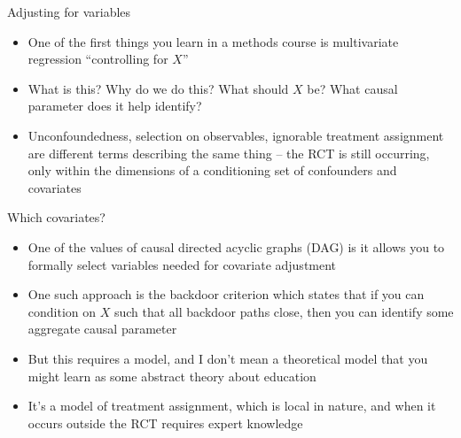 \documentclass{beamer}
\begin{document}
\begin{frame}{Adjusting for variables}

\begin{itemize}
\item One of the first things you learn in a methods course is multivariate regression ``controlling for $X$''
\item What is this? Why do we do this?  What should $X$ be? What causal parameter does it help identify?
\item Unconfoundedness, selection on observables, ignorable treatment assignment are different terms describing the same thing -- the RCT is still occurring, only within the dimensions of a conditioning set of confounders and covariates
\end{itemize}

\end{frame}


\begin{frame}{Which covariates?}

\begin{itemize}

\item One of the values of causal directed acyclic graphs (DAG) is it allows you to formally select variables needed for covariate adjustment
\item One such approach is the backdoor criterion which states that if you can condition on $X$ such that all backdoor paths close, then you can identify some aggregate causal parameter
\item But this requires a model, and I don't mean a theoretical model that you might learn as some abstract theory about education
\item It's a model of treatment assignment, which is local in nature, and when it occurs outside the RCT requires expert knowledge

\end{itemize}

\end{frame}
\end{document}
